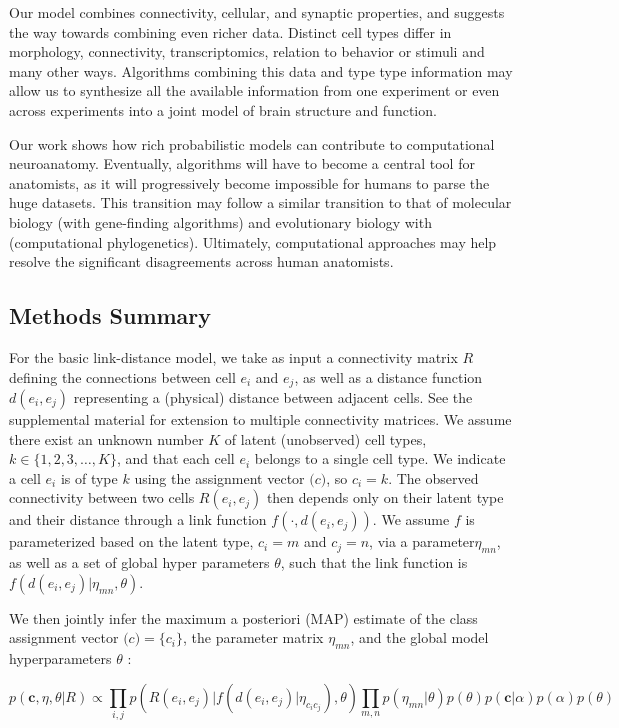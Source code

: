 \documentclass{article}
\renewcommand{\vec}[1]{\mathbf{#1}}
\begin{document}
{Our model combines connectivity, cellular, and synaptic properties,
and suggests the way towards combining even richer data. Distinct cell
types differ in morphology, connectivity, transcriptomics, relation to
behavior or stimuli and many other ways. Algorithms combining this
data and type type information may allow us to synthesize all the
available information from one experiment or even across experiments
into a joint model of brain structure and function.

Our work shows how rich probabilistic models can contribute to computational neuroanatomy. 
Eventually, algorithms will have to become a central tool for
anatomists, as it will progressively become impossible for humans to
parse the huge datasets. This transition may follow a similar
transition to that of molecular biology (with gene-finding
algorithms) and evolutionary biology with (computational
phylogenetics). Ultimately, computational approaches may help resolve the significant
disagreements across human anatomists. 


\subsection*{Methods Summary}

For the basic link-distance model, we take as input a connectivity
matrix $R$ defining the connections between cell $e_i$ and $e_j$, as
well as a distance function $d(e_i, e_j)$ representing a (physical)
distance between adjacent cells.  See
the supplemental material for extension to multiple connectivity
matrices. We assume there exist an unknown number $K$ of latent
(unobserved) cell types, $k \in \{1, 2, 3, \dots, K\}$, and that each
cell $e_i$ belongs to a single cell type. We indicate a cell $e_i$ is
of type $k$ using the assignment vector $\vec(c)$, so $c_i = k$. The
observed connectivity between two cells $R(e_i, e_j)$ then depends
only on their latent type and their distance through a link function
$f(\cdot, d(e_i, e_j))$. We assume $f$ is parameterized based on the
latent type, $c_i=m$ and $c_j=n$, via a parameter$\eta_{mn}$, as well
as a set of global hyper parameters $\theta$, such that the link
function is $f(d(e_i, e_j) | \eta_{mn}, \theta)$.

We then jointly infer the maximum a posteriori (MAP) estimate of the
class assignment vector $\vec(c) = \{c_i\}$, the parameter matrix
$\eta_{mn}$, and the global model hyperparameters $\theta$ :

\begin{equation}
  p(\vec{c}, \eta, \theta | R ) \propto \prod_{i, j} p(R(e_i, e_j) | f(d(e_i, e_j) | \eta_{c_ic_j}), \theta) \prod_{m, n} p(\eta_{mn} | \theta)  p(\theta) p(\vec{c} | \alpha) p(\alpha) p(\theta)
\end{equation}

}
\end{document}
